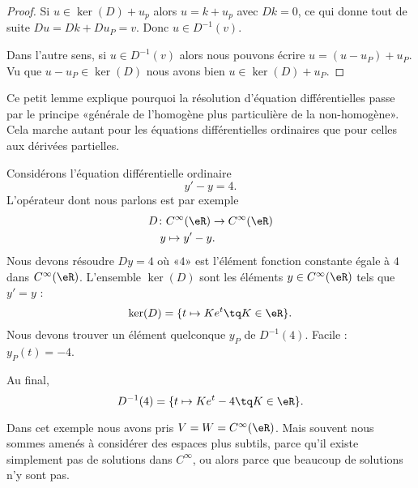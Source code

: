 \begin{proof}
	Si \( u\in \ker(D)+u_p\) alors \( u=k+u_p\) avec \( Dk=0\), ce qui donne tout de suite \( Du=Dk+Du_P=v\). Donc \( u\in D^{-1}(v)\).

	Dans l'autre sens, si \( u\in D^{-1}(v)\) alors nous pouvons écrire \( u=(u-u_P)+u_P\). Vu que \( u-u_P\in\ker(D)\) nous avons bien \( u\in\ker(D)+u_P\).
\end{proof}

Ce petit lemme explique pourquoi la résolution d'équation différentielles passe par le principe «générale de l'homogène plus particulière de la non-homogène». Cela marche autant pour les équations différentielles ordinaires que pour celles aux dérivées partielles.

\begin{example}
	Considérons l'équation différentielle ordinaire
	\begin{equation}
		y'-y=4.
	\end{equation}
	L'opérateur dont nous parlons est par exemple
	\begin{equation}
		\begin{aligned}
			D\colon & C^{\infty}(\eR)\to  C^{\infty}(\eR) \\
			y       & \mapsto y'-y .
		\end{aligned}
	\end{equation}
	Nous devons résoudre \( Dy=4\) où «\( 4\)»  est l'élément fonction constante égale à \( 4\) dans \(  C^{\infty}(\eR)\). L'ensemble \( \ker(D)\) sont les éléments \( y\in C^{\infty}(\eR)\) tels que \( y'=y\) :
	\begin{equation}
		\ker(D)=\{ t\mapsto K e^{t}\tq K\in \eR \}.
	\end{equation}
	Nous devons trouver un élément quelconque \( y_P\) de \( D^{-1}(4)\). Facile : \( y_P(t)=-4\).

	Au final,
	\begin{equation}
		D^{-1}(4)=\{ t\mapsto K e^{t}-4\tq K\in \eR \}.
	\end{equation}
\end{example}

Dans cet exemple nous avons pris \( V=W= C^{\infty}(\eR)\). Mais souvent nous sommes amenés à considérer des espaces plus subtils, parce qu'il existe simplement pas de solutions dans \(  C^{\infty}\), ou alors parce que beaucoup de solutions n'y sont pas.

